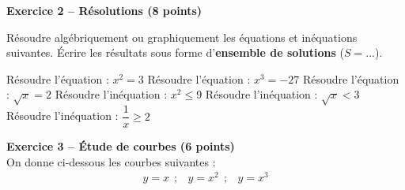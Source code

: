 \documentclass[12pt,a4paper]{exam}
\begin{document}
\noindent\hrulefill
\vspace{0.5cm}


\textbf{Exercice 2 – Résolutions (8 points)}
\vspace{5pt}

Résoudre algébriquement ou graphiquement les équations et inéquations suivantes. Écrire 
les résultats sous forme d'\textbf{ensemble de solutions} ($S = ...$).

\vspace{5pt}

\begin{questions}
    \question Résoudre l'équation : $x^2 = 3$
    \question Résoudre l'équation : $x^3 = -27$
    \question Résoudre l'équation : $\sqrt{x} = 2$
    \question Résoudre l'inéquation : $x^2 \leq 9$
    \question Résoudre l'inéquation : $\sqrt{x} < 3$
    \question Résoudre l'inéquation : $\dfrac{1}{x} \geq 2$
\end{questions}

\noindent\hrulefill
\vspace{0.5cm}


\textbf{Exercice 3 – Étude de courbes (6 points)}
\vspace{5pt}
\\On donne ci-dessous les courbes suivantes :
\[
\begin{array}{ccc}
    y = x \ \ ;
    & y = x^2 \ \ ;
    & y = x^3
\end{array}
\]

\begin{center}
\end{center}
\end{document}

